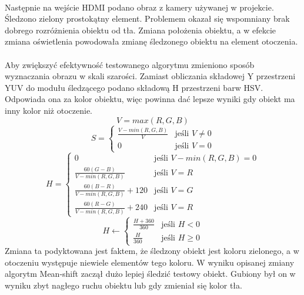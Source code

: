 \paragraph*{}
Następnie na wejście HDMI podano obraz z kamery używanej w projekcie. Śledzono zielony prostokątny element. Problemem okazał się wspomniany brak dobrego rozróżnienia obiektu od tła. Zmiana położenia obiektu, a w efekcie zmiana oświetlenia powodowała zmianę śledzonego obiektu na element otoczenia.

\paragraph*{}
Aby zwiększyć efektywność testowanego algorytmu zmieniono sposób wyznaczania obrazu w skali szarości. Zamiast obliczania składowej Y przestrzeni YUV do modułu śledzącego podano składową H przestrzeni barw HSV. Odpowiada ona za kolor obiektu, więc powinna dać lepsze wyniki gdy obiekt ma inny kolor niż otoczenie.
\begin{equation}
V=max(R,G,B)
\end{equation}
\begin{equation}
S=
	\begin{cases}
	\frac{V-min(R,G,B)}{V} &\text{jeśli } V \neq 0\\
	0 &\text{jeśli } V=0
	\end{cases}
\end{equation}
\begin{equation}
H=
	\begin{cases}
	0 &\text{jeśli } V-min(R,G,B)=0\\
	\frac{60(G-B)}{V-min(R,G,B)} &\text{jeśli } V=R\\
	\frac{60(B-R)}{V-min(R,G,B)}+120 &\text{jeśli } V=G\\
	\frac{60(R-G)}{V-min(R,G,B)}+240 &\text{jeśli } V=R
	\end{cases}
\end{equation}
\begin{equation}
H \leftarrow
	\begin{cases}
	\frac{H+360}{360} &\text{jeśli } H<0\\
	\frac{H}{360} &\text{jeśli } H \geqslant 0
	\end{cases}
\end{equation}
Zmiana ta podyktowana jest faktem, że śledzony obiekt jest koloru zielonego, a w otoczeniu występuje niewiele elementów tego koloru. W wyniku opisanej zmiany algorytm Mean-shift zaczął dużo lepiej śledzić testowy obiekt. Gubiony był on w wyniku zbyt nagłego ruchu obiektu lub gdy zmieniał się kolor tła.